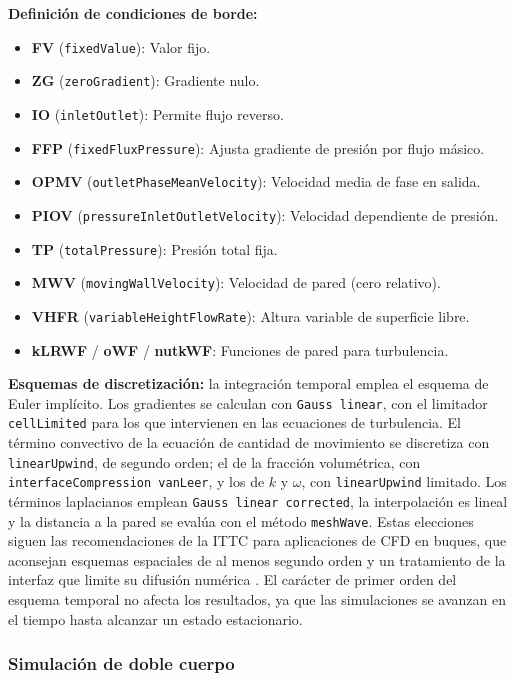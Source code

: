 \noindent\textbf{Definición de condiciones de borde:}
\begin{itemize}
    \item \textbf{FV} (\texttt{fixedValue}): Valor fijo.
    \item \textbf{ZG} (\texttt{zeroGradient}): Gradiente nulo.
    \item \textbf{IO} (\texttt{inletOutlet}): Permite flujo reverso.
    \item \textbf{FFP} (\texttt{fixedFluxPressure}): Ajusta gradiente de presión por flujo másico.
    \item \textbf{OPMV} (\texttt{outletPhaseMeanVelocity}): Velocidad media de fase en salida.
    \item \textbf{PIOV} (\texttt{pressureInletOutletVelocity}): Velocidad dependiente de presión.
    \item \textbf{TP} (\texttt{totalPressure}): Presión total fija.
    \item \textbf{MWV} (\texttt{movingWallVelocity}): Velocidad de pared (cero relativo).
    \item \textbf{VHFR} (\texttt{variableHeightFlowRate}): Altura variable de superficie libre.
    \item \textbf{kLRWF} / \textbf{oWF} / \textbf{nutkWF}: Funciones de pared para turbulencia.
\end{itemize}

\noindent\textbf{Esquemas de discretización:} la integración temporal emplea el esquema de Euler implícito. Los gradientes se calculan con \texttt{Gauss linear}, con el limitador \texttt{cellLimited} para los que intervienen en las ecuaciones de turbulencia. El término convectivo de la ecuación de cantidad de movimiento se discretiza con \texttt{linearUpwind}, de segundo orden; el de la fracción volumétrica, con \texttt{interfaceCompression vanLeer}, y los de $k$ y $\omega$, con \texttt{linearUpwind} limitado. Los términos laplacianos emplean \texttt{Gauss linear corrected}, la interpolación es lineal y la distancia a la pared se evalúa con el método \texttt{meshWave}.
Estas elecciones siguen las recomendaciones de la ITTC para aplicaciones de CFD en buques, que aconsejan esquemas espaciales de al menos segundo orden y un tratamiento de la interfaz que limite su difusión numérica
\citep{ITTC_CFD_guidelines}. El carácter de primer orden del esquema temporal no afecta los resultados, ya que las simulaciones se avanzan en el tiempo hasta alcanzar un estado estacionario.

\subsubsection{Simulación de doble cuerpo}\label{sec:doble_cuerpo}

